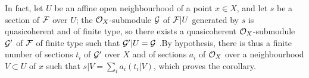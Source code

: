 In fact, let $U$ be an affine open neighbourhood of a point $x\in X$, and let
$s$ be a section of $\mathcal{F}$ over $U$; the $\mathcal{O}_X$-submodule $\mathcal{G}$ of
$\mathcal{F}|U$ generated by $s$ is quasicoherent and of finite type, so there
exists a quasicoherent $\mathcal{O}_X$-submodule $\mathcal{G}'$ of $\mathcal{F}$ of finite
type such that $\mathcal{G}'|U=\mathcal{G}$ .By hypothesis, there is thus a
finite number of sections $t_i$ of $\mathcal{G}'$ over $X$ and of sections $a_i$
of $\mathcal{O}_X$ over a neighbourhood $V\subset U$ of $x$ such that
$s|V=\sum_i a_i(t_i|V)$, which proves the corollary.


